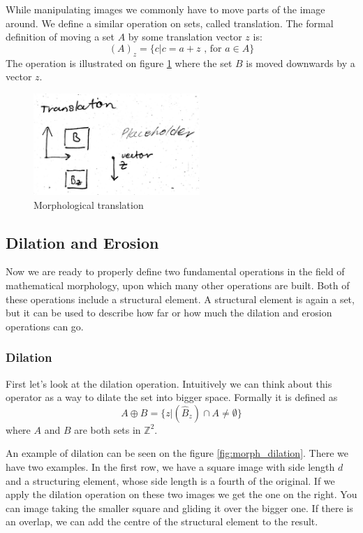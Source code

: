 \documentclass[
  digital,     %
  oneside,     %
  nosansbold,  %
  nocolorbold, %
  lof,         %
  lot,         %
]{fithesis4}
\newcommand*{\Z}{\ensuremath{\mathbb{Z}}}
\begin{document}
While manipulating images we commonly have to move parts of the image around. We
define a similar operation on sets, called translation. The formal definition of
moving a set $A$ by some translation vector $z$ is:
$$(A)_z = \{c | c = a + z\text{ , for } a \in A\}$$
The operation is illustrated on figure \ref{fig:morph_translation} where the set
$B$ is moved downwards by a vector $z$.
\begin{figure}
    \begin{center}
        \includegraphics[width=6.3cm]{resources/morph_translation.jpg}
    \end{center}
    \caption{Morphological translation} %
    \label{fig:morph_translation}
\end{figure}

\subsection{Dilation and Erosion}
Now we are ready to properly define two fundamental operations in the field of
mathematical morphology, upon which many other operations are built. Both of
these operations include a structural element. A structural element is again a
set, but it can be used to describe how far or how much the dilation and erosion
operations can go.

\subsubsection{Dilation}
First let's look at the dilation operation. Intuitively we can think about this
operator as a way to dilate the set into bigger space. Formally it is defined as
$$A \oplus B = \{z | (\hat{B}_z) \cap A \neq \emptyset\}$$
where $A$ and $B$ are both sets in $\Z^2$. 

An example of dilation can be seen on the figure
\ref{fig:morph_dilation}. There we have two examples. In the first row, we have
a square image with side length $d$ and a structuring element, whose side length
is a fourth of the original. If we apply the dilation operation on these two
images we get the one on the right. You can image taking the smaller square and
gliding it over the bigger one. If there is an overlap, we can add the centre of
the structural element to the result. 
\end{document}
